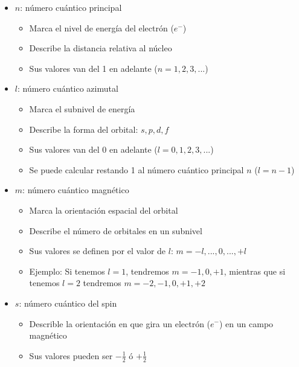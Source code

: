 \begin{itemize}
    \item $n$: número cuántico principal
        \begin{itemize}
            \item Marca el nivel de energía del electrón ($e^{-}$)
            \item Describe la distancia relativa al núcleo
            \item Sus valores van del 1 en adelante ($n=1,2,3,...$)
        \end{itemize}
    
    \item $l$: número cuántico azimutal
        \begin{itemize}
            \item Marca el subnivel de energía
            \item Describe la forma del orbital: $s,p,d,f$
            \item Sus valores van del 0 en adelante ($l=0,1,2,3,...$)
            \item Se puede calcular restando 1 al número cuántico principal $n$ ($l=n-1$)
        \end{itemize}
    
    
    \item $m$: número cuántico magnético
        \begin{itemize}
            \item Marca la orientación espacial del orbital
            \item Describe el número de orbitales en un subnivel
            \item Sus valores se definen por el valor de $l$: $m=-l,...,0,...,+l$
    	    \item Ejemplo: Si tenemos $l=1$, tendremos $m=-1,0,+1$, mientras que si tenemos $l=2$ tendremos $m=-2,-1,0,+1,+2$
        \end{itemize}
    
    
    \item $s$: número cuántico del spin
        \begin{itemize}
            \item Describle la orientación en que gira un electrón ($e^{-}$) en un campo magnético
            \item Sus valores pueden ser $-\frac{1}{2}$ ó $+\frac{1}{2}$
        \end{itemize}
    
\end{itemize}

